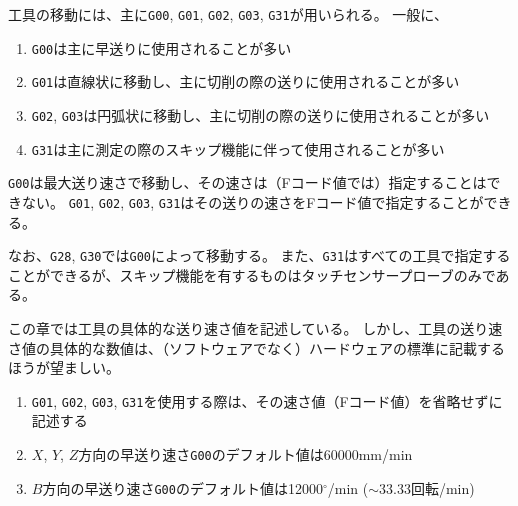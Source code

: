 


工具の移動には、主に\verb|G00|, \verb|G01|, \verb|G02|, \verb|G03|, \verb|G31|が用いられる。
一般に、
\begin{enumerate}
\item \verb|G00|は主に早送りに使用されることが多い
\item \verb|G01|は直線状に移動し、主に切削の際の送りに使用されることが多い
\item \verb|G02|, \verb|G03|は円弧状に移動し、主に切削の際の送りに使用されることが多い
\item \verb|G31|は主に測定の際のスキップ機能に伴って使用されることが多い
\end{enumerate}
\verb|G00|は最大送り速さで移動し、その速さは（Fコード値では）指定することはできない。
\verb|G01|, \verb|G02|, \verb|G03|, \verb|G31|はその送りの速さをFコード値で指定することができる。

なお、\verb|G28|, \verb|G30|では\verb|G00|によって移動する。
また、\verb|G31|はすべての工具で指定することができるが、スキップ機能を有するものはタッチセンサープローブのみである。
\begin{hosoku}
この章では工具の具体的な送り速さ値を記述している。
しかし、工具の送り速さ値の具体的な数値は、（ソフトウェアでなく）ハードウェアの標準に記載するほうが望ましい。
\end{hosoku}


\begin{enumerate}
\item \verb|G01|, \verb|G02|, \verb|G03|, \verb|G31|を使用する際は、その速さ値（Fコード値）を省略せずに記述する
\item $X$, $Y$, $Z$方向の早送り速さ\verb|G00|のデフォルト値は60000mm/min
\item $B$方向の早送り速さ\verb|G00|のデフォルト値は12000$^\circ$/min ($\sim 33.33$回転/min)
\end{enumerate}

